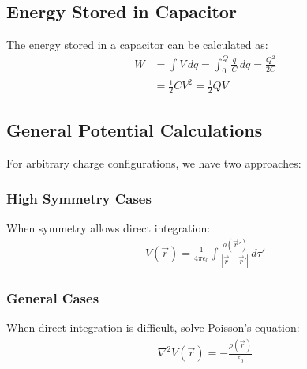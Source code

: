 \documentclass{article}
\begin{document}
\subsection{Energy Stored in Capacitor}
\begin{conceptbox}
The energy stored in a capacitor can be calculated as:
\begin{align*}
    W &= \int V \, dq = \int_0^Q \frac{q}{C} \, dq = \frac{Q^2}{2C} \\
    &= \frac{1}{2}CV^2 = \frac{1}{2}QV
\end{align*}
\end{conceptbox}

\subsection{General Potential Calculations}
For arbitrary charge configurations, we have two approaches:

\subsubsection{High Symmetry Cases}
When symmetry allows direct integration:
\begin{align*}
    V(\vec{r}) = \frac{1}{4\pi\epsilon_0} \int \frac{\rho(\vec{r}')}{|\vec{r} - \vec{r}'|} \, d\tau'
\end{align*}

\subsubsection{General Cases}
When direct integration is difficult, solve Poisson's equation:
\begin{align*}
    \nabla^2 V(\vec{r}) = -\frac{\rho(\vec{r})}{\epsilon_0}
\end{align*}
\end{document}
